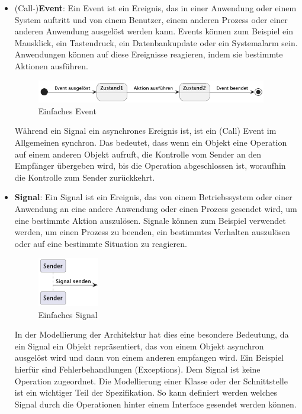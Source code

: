 \begin{itemize}  
\item (Call-)\textbf{Event}:
Ein Event ist ein Ereignis, das in einer Anwendung oder einem System auftritt und von einem Benutzer, einem anderen Prozess oder einer anderen Anwendung ausgelöst werden kann. Events können zum Beispiel ein Mausklick, ein Tastendruck, ein Datenbankupdate oder ein Systemalarm sein. Anwendungen können auf diese Ereignisse reagieren, indem sie bestimmte Aktionen ausführen.
\begin{figure}[!h]
  \centering
  \includegraphics[width=0.95\textwidth]{fig/uml/simple-event.png}
  \caption{Einfaches Event}
  \label{fig:simple-event}
\end{figure}
Während ein Signal ein asynchrones Ereignis ist, ist ein (Call) Event im Allgemeinen synchron. Das bedeutet, dass wenn ein Objekt eine Operation auf einem anderen Objekt aufruft, die Kontrolle vom Sender an den Empfänger übergeben wird, bis die Operation abgeschlossen ist, woraufhin die Kontrolle zum Sender zurückkehrt. 

\item \textbf{Signal}:
Ein Signal ist ein Ereignis, das von einem Betriebssystem oder einer Anwendung an eine andere Anwendung oder einen Prozess gesendet wird, um eine bestimmte Aktion auszulösen. Signale können zum Beispiel verwendet werden, um einen Prozess zu beenden, ein bestimmtes Verhalten auszulösen oder auf eine bestimmte Situation zu reagieren.
\begin{figure}[!h]
  \centering
  \includegraphics[width=0.25\textwidth]{fig/uml/simple-signal.png}
  \caption{Einfaches Signal}
  \label{fig:simple-signal}
\end{figure}
In der Modellierung der Architektur hat dies eine besondere Bedeutung, da ein Signal ein Objekt repräsentiert, das von einem Objekt asynchron ausgelöst wird und dann von einem anderen empfangen wird. Ein Beispiel hierfür sind Fehlerbehandlungen (Exceptions). Dem Signal ist keine Operation zugeordnet. Die Modellierung einer Klasse oder der Schnittstelle ist ein wichtiger Teil der Spezifikation. So kann definiert werden welches Signal durch die Operationen hinter einem Interface gesendet werden können.


\end{itemize}
